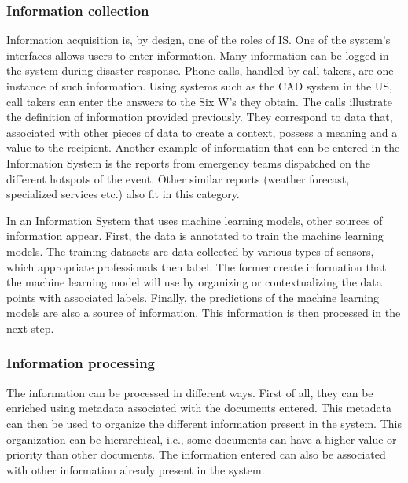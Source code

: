 \subsubsection{Information collection}
Information acquisition is, by design, one of the roles of IS.
One of the system's interfaces allows users to enter information.
Many information can be logged in the system during disaster response.
Phone calls, handled by call takers, are one instance of such information.
Using systems such as the CAD system in the US, call takers can enter the answers to the
Six W's they obtain.
The calls illustrate the definition of information provided previously.
They correspond to data that, associated with other pieces of data to create a context, possess a meaning and a value to the recipient.
Another example of information that can be entered in the Information System is the reports from emergency teams dispatched on the different hotspots of the event.
Other similar reports (weather forecast, specialized services etc.) also fit in this category.

In an Information System that uses machine learning models, other sources of information appear.
First, the data is annotated to train the machine learning models.
The training datasets are data collected by various types of sensors, which appropriate professionals then label.
The former create information that the machine learning model will use by organizing or contextualizing the data points with associated labels.
Finally, the predictions of the machine learning models are also a source of information.
This information is then processed in the next step.

\subsubsection{Information processing}
The information can be processed in different ways.
First of all, they can be enriched using metadata associated with the documents entered.
This metadata can then be used to organize the different information present in the system.
This organization can be hierarchical, i.e., some documents can have a higher value or priority than other documents.
The information entered can also be associated with other information already present in the system.

